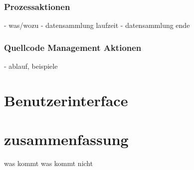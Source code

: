 \subsubsection{Prozessaktionen}

- was/wozu
- datensammlung laufzeit
- datensammlung ende

\subsubsection{Quellcode Management Aktionen}

- ablauf, beispiele


\section{Benutzerinterface}



\section{zusammenfassung}

was kommt
was kommt nicht

